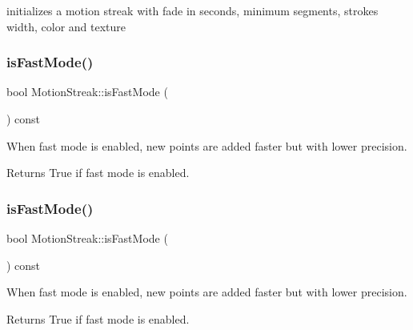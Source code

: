 initializes a motion streak with fade in seconds, minimum segments, stroke\textquotesingle{}s width, color and texture \mbox{\label{classMotionStreak_a6198d0182d9c932af19a7517419e76dc}} 
\subsubsection{\texorpdfstring{is\+Fast\+Mode()}{isFastMode()}\hspace{0.1cm}{\footnotesize\ttfamily [1/2]}}
{\footnotesize\ttfamily bool Motion\+Streak\+::is\+Fast\+Mode (\begin{DoxyParamCaption}{ }\end{DoxyParamCaption}) const\hspace{0.3cm}{\ttfamily [inline]}}

When fast mode is enabled, new points are added faster but with lower precision.

\begin{DoxyReturn}{Returns}
True if fast mode is enabled. 
\end{DoxyReturn}
\mbox{\label{classMotionStreak_a6198d0182d9c932af19a7517419e76dc}} 
\subsubsection{\texorpdfstring{is\+Fast\+Mode()}{isFastMode()}\hspace{0.1cm}{\footnotesize\ttfamily [2/2]}}
{\footnotesize\ttfamily bool Motion\+Streak\+::is\+Fast\+Mode (\begin{DoxyParamCaption}{ }\end{DoxyParamCaption}) const\hspace{0.3cm}{\ttfamily [inline]}}

When fast mode is enabled, new points are added faster but with lower precision.

\begin{DoxyReturn}{Returns}
True if fast mode is enabled. 
\end{DoxyReturn}
\mbox{\label{classMotionStreak_a9cadee9d318c3bbc1e299563e0ce8d97}} 
